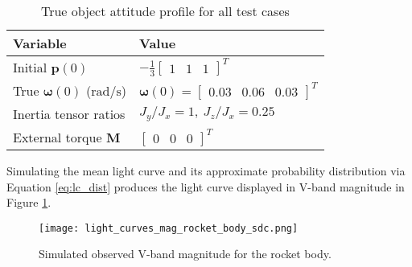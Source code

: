 \documentclass[a4paper,twocolumn]{spaceDebrisC} %
\newcommand{\vctr}[1]{\bm{#1}}
\newcommand{\figmed}[0]{0.4\textwidth}
\newcommand{\figsmall}[0]{0.3\textwidth}
\begin{document}
\begin{table}[H]
  \centering
  \caption{True object attitude profile for all test cases}
  \vspace*{6pt}
  \begin{tabular}{|l|l|}
  \hline
  \textbf{Variable} & \textbf{Value} \\ \hline
 Initial $\vctr{p}(0)$ & $-\frac{1}{3} \begin{bmatrix} 1 & 1 & 1 \end{bmatrix}^T$ \\ \hline
 True $\vctr{\omega}(0)$ ($\text{rad}/\text{s}$) & $\vctr{\omega}(0) = \begin{bmatrix} 0.03 & 0.06 & 0.03 \end{bmatrix}^T$ \\ \hline
 Inertia tensor ratios & $J_y / J_x = 1, \: J_z / J_x = 0.25$ \\ \hline
 External torque $\vctr{M}$ & $\begin{bmatrix} 0 & 0 & 0 \end{bmatrix}^T$ \\ \hline
  \end{tabular}
  \label{tb:synth_att}
\end{table}
\FloatBarrier

Simulating the mean light curve and its approximate probability distribution via Equation \ref{eq:lc_dist} produces the light curve displayed in V-band magnitude in Figure \ref{fig:obs_mag_synth}.


\begin{figure}[H]
  \centering
  \texttt{[image: light\_curves\_mag\_rocket\_body\_sdc.png]}
  \caption{Simulated observed V-band magnitude for the rocket body.}
  \label{fig:obs_mag_synth}
\end{figure}

\end{document}
